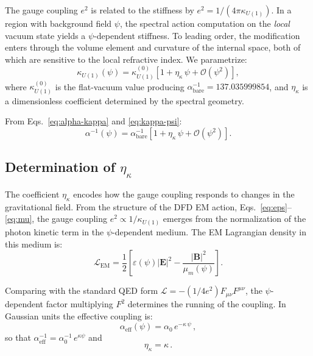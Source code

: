 \documentclass[aps,prd,twocolumn,superscriptaddress,nofootinbib]{revtex4-2}
\newcommand{\order}[1]{\mathcal{O}(#1)}
\newcommand{\kap}{\kappa}
\newcommand{\calL}{\mathcal{L}}
\newcommand{\ainv}{\alpha^{-1}}
\newcommand{\aeff}{\alpha_{\mathrm{eff}}}
\begin{document}
The gauge coupling $e^2$ is related to the stiffness by
$e^2 = 1/(4\pi\kap_{U(1)})$.  In a region with background field
$\psi$, the spectral action computation on the \emph{local} vacuum
state yields a $\psi$-dependent stiffness.  To leading order, the
modification enters through the volume element and curvature
of the internal space, both of which are sensitive to the local
refractive index.  We parametrize:
\begin{equation}\label{eq:kappa-psi}
\kap_{U(1)}(\psi) = \kap_{U(1)}^{(0)}\left[1 + \eta_\kap\,\psi
+ \order{\psi^2}\right],
\end{equation}
where $\kap_{U(1)}^{(0)}$ is the flat-vacuum value producing
$\ainv_{\mathrm{bare}} = 137.035999854$, and $\eta_\kap$ is a
dimensionless coefficient determined by the spectral geometry.

From Eqs.~\eqref{eq:alpha-kappa} and \eqref{eq:kappa-psi}:
\begin{equation}\label{eq:alpha-psi}
\ainv(\psi) = \ainv_{\mathrm{bare}}\left[1 + \eta_\kap\,\psi
+ \order{\psi^2}\right].
\end{equation}

\subsection{Determination of $\eta_\kap$}
\label{sec:eta-kappa}

The coefficient $\eta_\kap$ encodes how the gauge coupling responds to
changes in the gravitational field.  From the structure of the DFD
EM action, Eqs.~\eqref{eq:eps}--\eqref{eq:mu}, the gauge coupling
$e^2 \propto 1/\kap_{U(1)}$ emerges from the normalization of the
photon kinetic term in the $\psi$-dependent medium.  The EM Lagrangian
density in this medium is:
\begin{equation}
\calL_{\mathrm{EM}} = \frac{1}{2}\left[\varepsilon(\psi)|\mathbf{E}|^2
- \frac{|\mathbf{B}|^2}{\mu_m(\psi)}\right].
\end{equation}

Comparing with the standard QED form
$\calL = -(1/4e^2)F_{\mu\nu}F^{\mu\nu}$, the $\psi$-dependent
factor multiplying $F^2$ determines the running of the coupling.
In Gaussian units the effective coupling is:
\begin{equation}\label{eq:alpha-eff-general}
\aeff(\psi) = \alpha_0\,e^{-\kap\,\psi}\,,
\end{equation}
so that $\ainv_{\mathrm{eff}} = \ainv_0\,e^{\kap\psi}$ and
\begin{equation}\label{eq:eta-is-kappa}
\eta_\kap = \kap\,.
\end{equation}
\end{document}
